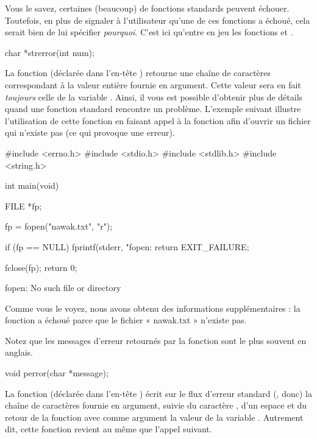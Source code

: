 Vous le savez, certaines (beaucoup) de fonctions standards peuvent 
échouer. Toutefois, en plus de signaler à l'utilisateur qu'une de 
ces fonctions a échoué, cela serait bien de lui spécifier \emph{pourquoi}. 
C'est ici qu'entre en jeu les fonctions  et .

\begin{C}
char *strerror(int num);
\end{C}

La fonction  (déclarée dans l'en-tête
) retourne une chaîne de
caractères correspondant à la valeur entière fournie en argument. Cette
valeur sera en fait \emph{toujours} celle de la variable .
Ainsi, il vous est possible d'obtenir plus de détails quand une fonction
standard rencontre un problème. L'exemple suivant illustre l'utilisation
de cette fonction en faisant appel à la fonction  afin
d'ouvrir un fichier qui n'existe pas (ce qui provoque une erreur).

\begin{C}
#include <errno.h>
#include <stdio.h>
#include <stdlib.h>
#include <string.h>


int main(void)
{
    FILE *fp;

    fp = fopen("nawak.txt", "r");

    if (fp == NULL)
    {
        fprintf(stderr, "fopen: %
        return EXIT_FAILURE;
    }

    fclose(fp);
    return 0;
}
\end{C}

\begin{C}
fopen: No such file or directory
\end{C}

Comme vous le voyez, nous avons obtenu des informations supplémentaires
: la fonction a échoué parce que le fichier « nawak.txt » n'existe pas.

\begin{infobox} 
 Notez que les messages d'erreur
retournés par la fonction  sont le plus souvent en
anglais.
\end{infobox}


\begin{C}
void perror(char *message);
\end{C}

La fonction  (déclarée dans l'en-tête
) écrit sur le flux d'erreur
standard (, donc) la chaîne de caractères fournie en
argument, suivie du caractère \mybox{:}, d'un espace et du retour de la
fonction  avec comme argument la valeur de la
variable . Autrement dit, cette fonction revient au même
que l'appel suivant.

